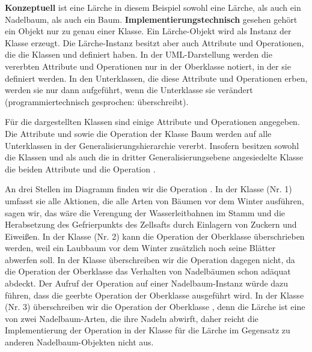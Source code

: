 \textbf{Konzeptuell} ist eine Lärche in diesem Beispiel sowohl eine Lärche, als auch ein Nadelbaum, als auch ein Baum. \textbf{Implementierungstechnisch} gesehen gehört ein Objekt nur zu genau einer Klasse. Ein Lärche-Objekt wird als Instanz der Klasse  erzeugt. Die Lärche-Instanz besitzt aber auch Attribute und Operationen, die die Klassen  und  definiert haben. In der UML-Darstellung werden die vererbten Attribute und Operationen nur in der Oberklasse notiert, in der sie definiert werden. In den Unterklassen, die diese Attribute und Operationen erben, werden sie nur dann aufgeführt, wenn die Unterklasse sie verändert (programmiertechnisch gesprochen: überschreibt). 

Für die dargestellten Klassen sind einige Attribute und Operationen angegeben. Die Attribute  und  sowie die Operation  der Klasse Baum werden auf alle Unterklassen in der Generalisierungshierarchie vererbt. Insofern besitzen sowohl die Klassen  und  als auch die in dritter Generalisierungsebene angesiedelte Klasse  die beiden Attribute und die Operation . 

\vspace{1mm} %

An drei Stellen im Diagramm finden wir die Operation . In der Klasse  (Nr. 1) umfasst sie alle Aktionen, die alle Arten von Bäumen vor dem Winter ausführen, sagen wir, das wäre die Verengung der Wasserleitbahnen im Stamm und die Herabsetzung des Gefrierpunkts des Zellsafts durch Einlagern von Zuckern und Eiweißen. In der Klasse  (Nr. 2) kann die Operation  der Oberklasse  überschrieben werden, \zb weil ein Laubbaum vor dem Winter zusätzlich noch seine Blätter abwerfen soll. In der Klasse  überschreiben wir die Operation dagegen nicht, da die Operation der Oberklasse  das Verhalten von Nadelbäumen schon adäquat abdeckt. Der Aufruf der Operation  auf einer Nadelbaum-Instanz würde dazu führen, dass die geerbte Operation der Oberklasse  ausgeführt wird. In der Klasse  (Nr. 3) überschreiben wir die Operation der Oberklasse , denn die Lärche ist eine von zwei Nadelbaum-Arten, die ihre Nadeln abwirft, daher reicht die Implementierung der Operation in der Klasse  für die Lärche im Gegensatz zu anderen Nadelbaum-Objekten nicht aus. 

